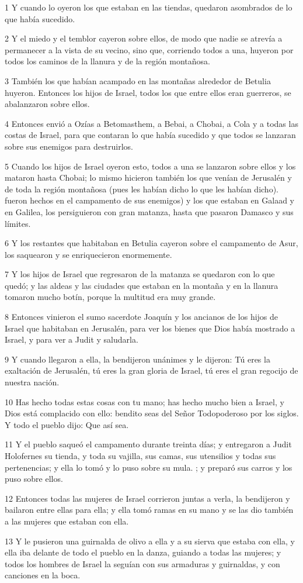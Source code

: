 \par 1 Y cuando lo oyeron los que estaban en las tiendas, quedaron asombrados de lo que había sucedido.
\par 2 Y el miedo y el temblor cayeron sobre ellos, de modo que nadie se atrevía a permanecer a la vista de su vecino, sino que, corriendo todos a una, huyeron por todos los caminos de la llanura y de la región montañosa.
\par 3 También los que habían acampado en las montañas alrededor de Betulia huyeron. Entonces los hijos de Israel, todos los que entre ellos eran guerreros, se abalanzaron sobre ellos.
\par 4 Entonces envió a Ozías a Betomasthem, a Bebai, a Chobai, a Cola y a todas las costas de Israel, para que contaran lo que había sucedido y que todos se lanzaran sobre sus enemigos para destruirlos.
\par 5 Cuando los hijos de Israel oyeron esto, todos a una se lanzaron sobre ellos y los mataron hasta Chobai; lo mismo hicieron también los que venían de Jerusalén y de toda la región montañosa (pues les habían dicho lo que les habían dicho). fueron hechos en el campamento de sus enemigos) y los que estaban en Galaad y en Galilea, los persiguieron con gran matanza, hasta que pasaron Damasco y sus límites.
\par 6 Y los restantes que habitaban en Betulia cayeron sobre el campamento de Asur, los saquearon y se enriquecieron enormemente.
\par 7 Y los hijos de Israel que regresaron de la matanza se quedaron con lo que quedó; y las aldeas y las ciudades que estaban en la montaña y en la llanura tomaron mucho botín, porque la multitud era muy grande.
\par 8 Entonces vinieron el sumo sacerdote Joaquín y los ancianos de los hijos de Israel que habitaban en Jerusalén, para ver los bienes que Dios había mostrado a Israel, y para ver a Judit y saludarla.
\par 9 Y cuando llegaron a ella, la bendijeron unánimes y le dijeron: Tú eres la exaltación de Jerusalén, tú eres la gran gloria de Israel, tú eres el gran regocijo de nuestra nación.
\par 10 Has hecho todas estas cosas con tu mano; has hecho mucho bien a Israel, y Dios está complacido con ello: bendito seas del Señor Todopoderoso por los siglos. Y todo el pueblo dijo: Que así sea.
\par 11 Y el pueblo saqueó el campamento durante treinta días; y entregaron a Judit Holofernes su tienda, y toda su vajilla, sus camas, sus utensilios y todas sus pertenencias; y ella lo tomó y lo puso sobre su mula. ; y preparó sus carros y los puso sobre ellos.
\par 12 Entonces todas las mujeres de Israel corrieron juntas a verla, la bendijeron y bailaron entre ellas para ella; y ella tomó ramas en su mano y se las dio también a las mujeres que estaban con ella.
\par 13 Y le pusieron una guirnalda de olivo a ella y a su sierva que estaba con ella, y ella iba delante de todo el pueblo en la danza, guiando a todas las mujeres; y todos los hombres de Israel la seguían con sus armaduras y guirnaldas, y con canciones en la boca.


